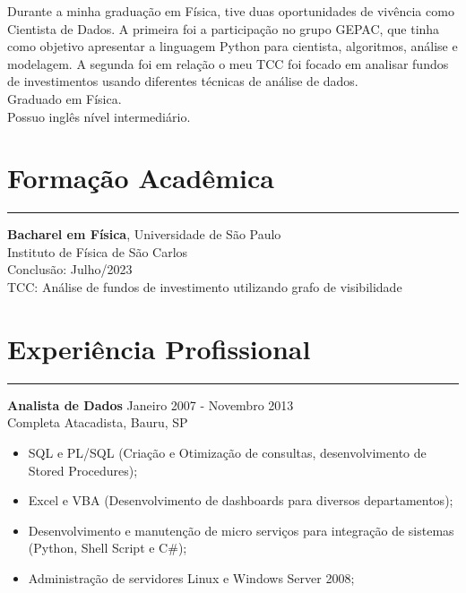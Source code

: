 \documentclass[10pt]{article}
\begin{document}
Durante a minha graduação em Física, tive duas oportunidades de vivência como Cientista de Dados. A primeira foi a participação no grupo GEPAC, que tinha como objetivo apresentar a linguagem Python para cientista, algoritmos, análise e modelagem. A segunda foi em relação o meu TCC foi focado em analisar fundos de investimentos usando diferentes técnicas de análise de dados.
\\

Graduado em Física.
\\

Possuo inglês nível intermediário.



\section*{Formação Acadêmica}
\vspace{-15pt}
\rule{\linewidth}{1pt}

{\bf Bacharel em Física}, Universidade de São Paulo \\
Instituto de Física de São Carlos \\
Conclusão: Julho/2023 \\
TCC: Análise de fundos de investimento utilizando grafo de visibilidade

 
\section*{Experiência Profissional}
\vspace{-15pt}
\rule{\linewidth}{1pt}

{\bf Analista de Dados} \hfill  Janeiro 2007 - Novembro 2013\\
Completa Atacadista, Bauru, SP

\begin{itemize} \itemsep -2pt %
    \item SQL e PL/SQL (Criação e Otimização de consultas, desenvolvimento de Stored Procedures);
    \item Excel e VBA (Desenvolvimento de dashboards para diversos departamentos);
    \item Desenvolvimento e manutenção de micro serviços para integração de sistemas (Python, Shell Script e C\#);
    \item Administração de servidores Linux e Windows Server 2008;
\end{itemize}
\end{document}
